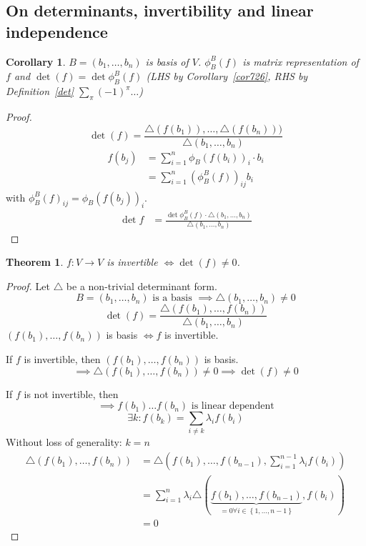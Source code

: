 \documentclass{article}
\newtheorem{theorem}{Theorem}  \numberwithin{theorem}{section}
\newtheorem*{corollary}{Corollary}%
\newcommand{\set}[1]{\left\{#1\right\}}
\begin{document}
\subsection{On determinants, invertibility and linear independence}

\begin{corollary} %
  $B = (b_1, \dots, b_n)$ is basis of $V$.
  $\phi_B^B(f)$ is matrix representation of $f$ and $\det(f) = \det\phi_B^B(f)$
  (LHS by Corollary~\ref{cor726}, RHS by Definition~\ref{det} $\sum_{\pi} (-1)^\pi \dots$)
\end{corollary}

\begin{proof}
  \[ \det(f) = \frac{\triangle(f(b_1)), \dots, \triangle(f(b_n)))}{\triangle (b_1, \dots, b_n)} \]
  \begin{align*}
    f(b_j) &= \sum_{i=1}^n \phi_B(f(b_i))_i \cdot b_i \\
         &= \sum_{i=1}^n \left(\phi_B^B(f)\right)_{ij} b_i
  \end{align*}
  with $\phi_B^B(f)_{ij} = \phi_B(f(b_j))_i$.
  \begin{align*}
    \det{f} &= \frac{\det{\phi_B^B(f) \cdot \triangle(b_1, \dots, b_n)}}{\triangle(b_1, \dots, b_n)}
  \end{align*}
\end{proof}

\begin{theorem} %
  $f: V \to V$ is invertible $\iff \det(f) \neq 0$.
\end{theorem}
\begin{proof}
  Let $\triangle$ be a non-trivial determinant form.
  \[ B = (b_1, \dots, b_n) \text{ is a basis } \implies \triangle(b_1, \dots, b_n) \neq 0 \]
  \[ \det(f) = \frac{\triangle(f(b_1), \dots, f(b_n))}{\triangle(b_1, \dots, b_n)} \]
  $(f(b_1), \dots, f(b_n))$ is basis $\iff f$ is invertible.

  If $f$ is invertible, then $(f(b_1), \dots, f(b_n))$ is basis.
  \[ \implies \triangle (f(b_1), \dots, f(b_n)) \neq 0 \implies \det(f) \neq 0 \]

  If $f$ is not invertible, then
  \[ \implies f(b_1) \dots f(b_n) \text{ is linear dependent} \]
  \[ \exists k: f(b_k) = \sum_{i\neq k} \lambda_i f(b_i) \]
  Without loss of generality: $k = n$
  \begin{align*}
    \triangle(f(b_1), \dots, f(b_n)) &= \triangle(f(b_1), \dots, f(b_{n-1}), \sum_{i=1}^{n-1} \lambda_i f(b_i)) \\
      &= \sum_{i=1}^n \lambda_i \triangle(\underbrace{f(b_1), \dots, f(b_{n-1})}_{=0 \forall i \in \set{1,\dots,n-1}}, f(b_i)) \\
      &= 0
  \end{align*}
\end{proof}
\end{document}

